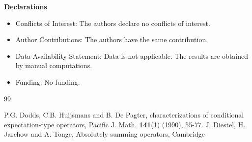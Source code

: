 \documentclass{amsart}
\theoremstyle{definition}\newtheorem{defn}[thm]{Definition}
\theoremstyle{remark}
\numberwithin{equation}{section}
\begin{document}
{\bf Declarations}
\begin{itemize}
\item Conflicts of Interest:
The authors declare no conflicts of interest.
\item Author Contributions:
The authors have the same contribution.
\item Data Availability Statement:
Data is not applicable. The results are obtained by manual computations.
\item Funding:
No funding.
\end{itemize}
\begin{thebibliography}{99}

 P.G. Dodds, C.B. Huijsmans and B. De Pagter,
characterizations of conditional expectation-type operators,
Pacific J. Math. {\bf 141}(1) (1990), 55-77.
 J. Diestel, H. Jarchow and A. Tonge, Absolutely summing operators, Cambridge

\end{thebibliography}
\end{document}
